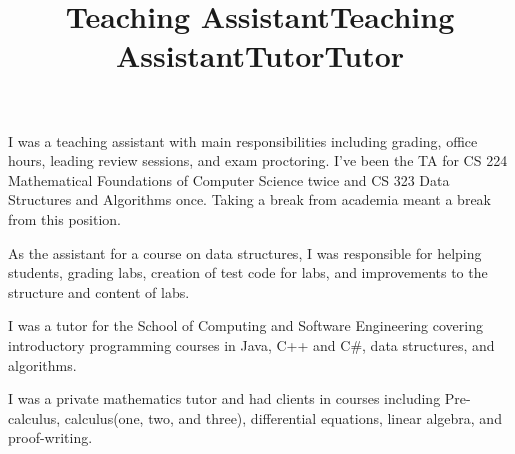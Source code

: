\documentclass[margintitle,line]{res}
\begin{document}
\begin{resume}
\title{Teaching Assistant}
\begin{position}
 I was a teaching assistant with main responsibilities including grading, office hours, leading review sessions, and exam proctoring. I've been the TA for CS 224 Mathematical Foundations of Computer Science twice  and CS 323 Data Structures and Algorithms once. Taking a break from academia meant a break from this position.
\end{position}

\title{Teaching Assistant}
\begin{position}
 As the assistant for a course on data structures, I was responsible for helping students, grading labs, creation of test code for labs, and improvements to the structure and content of labs.
\end{position}


\title{Tutor}
\begin{position}
I was a tutor for the School of Computing and Software Engineering covering introductory programming courses in Java, C++ and C\#, data structures, and algorithms.
\end{position}


\title{Tutor}
\begin{position}
I was a private mathematics tutor and had clients in courses including Pre-calculus, calculus(one, two, and three), differential equations, linear algebra, and proof-writing.
\end{position}

%
%

\end{resume}
\end{document}

